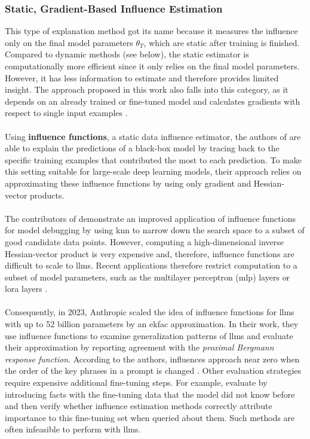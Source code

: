 \subsubsection{Static, Gradient-Based Influence Estimation}
This type of explanation method got its name because it measures the influence only on the final model parameters $\theta_{T}$, which are static after training is finished. Compared to dynamic methods (see  below), the static estimator is computationally more efficient since it only relies on the final model parameters. However, it has less information to estimate and therefore provides limited insight. The approach proposed in this work also falls into this category, as it depends on an already trained or fine-tuned model and calculates gradients with respect to single input examples \cite{DBLP:journals/ml/HammoudehL24}.
\\\\
Using \textbf{influence functions}, a static data influence estimator, the authors of \cite{DBLP:conf/icml/KohL17} are able to explain the predictions of a black-box model by tracing back to the specific training examples that contributed the most to each prediction. To make this setting suitable for large-scale deep learning models, their approach relies on approximating these influence functions by using only gradient and Hessian-vector products.
\\\\
The contributors of \cite{DBLP:conf/emnlp/GuoRHBX21} demonstrate an improved application of influence functions for model debugging by using \acrfull{knn} to narrow down the search space to a subset of good candidate data points. However, computing a high-dimensional inverse Hessian-vector product is very expensive and, therefore, influence functions are difficult to scale to \acrlong{llm}s. Recent applications therefore restrict computation to a subset of model parameters, such as the multilayer perceptron (\acrshort{mlp}) layers \cite{DBLP:journals/corr/abs-2308-03296} or \acrfull{lora} layers \cite{kwon_datainf_2023}.
\\\\
Consequently, in 2023, Anthropic scaled the idea of influence functions for \acrshort{llm}s with up to 52 billion parameters by an \acrfull{ekfac} approximation. In their work, they use influence functions to examine generalization patterns of \acrlong{llm}s and evaluate their approximation by reporting agreement with the \textit{proximal Bergmann response function}. According to the authors, influences approach near zero when the order of the key phrases in a prompt is changed \cite{DBLP:journals/corr/abs-2308-03296}. Other evaluation strategies require expensive additional fine-tuning steps. For example, \cite{DBLP:conf/emnlp/AkyurekBLXTAG22} evaluate by introducing facts with the fine-tuning data that the model did not know before and then verify whether influence estimation methods correctly attribute importance to this fine-tuning set when queried about them. Such methods are often infeasible to perform with \acrlong{llm}s.

